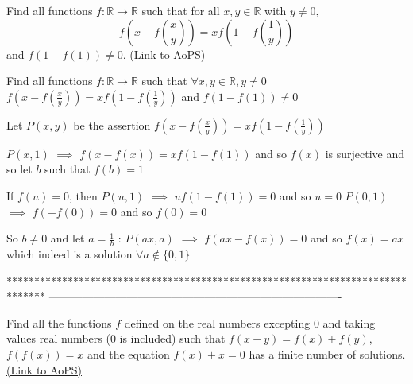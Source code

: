 \begin{problem}
	Find all functions $f:\mathbb{R} \to\mathbb{R}$ such that for all $x,y \in \mathbb{R}$ with $y\neq 0$,
\[f \left( x - f \left( \frac{x}{y} \right)\right)=xf\left(1-f\left(\frac{1}{y}\right)\right)\] and $f(1-f(1))\neq 0$.
	\flushright \href{https://artofproblemsolving.com/community/c6h449397}{(Link to AoPS)}
\end{problem}



\begin{solution}
	\begin{tcolorbox}Find all functions $f:\mathbb{R} \to\mathbb{R}$ such that 
$\forall x,y \in \mathbb{R}, y\neq 0$
$f(x-f(\frac{x}{y}))=xf(1-f(\frac{1}{y}))$ and $f(1-f(1))\neq 0$\end{tcolorbox}
Let $P(x,y)$ be the assertion $f(x-f(\frac xy))=xf(1-f(\frac 1y))$

$P(x,1)$ $\implies$ $f(x-f(x))=xf(1-f(1))$ and so $f(x)$ is surjective and so let $b$ such that $f(b)=1$

If $f(u)=0$, then $P(u,1)$ $\implies$ $uf(1-f(1))=0$ and so $u=0$ 
$P(0,1)$ $\implies$ $f(-f(0))=0$ and so $f(0)=0$

So $b\ne 0$ and let $a=\frac 1b$ : $P(ax,a)$ $\implies$ $f(ax-f(x))=0$ and so $\boxed{f(x)=ax}$ which indeed is a solution $\forall a\notin\{0,1\}$
\end{solution}
*******************************************************************************
-------------------------------------------------------------------------------

\begin{problem}
	Find all the functions  $ f $ defined on the real numbers excepting $ 0 $ and taking values real numbers ($ 0 $ is included) such that $ f(x+y)=f(x)+f(y) $, $ f(f(x))=x $ and the equation $ f(x)+x=0 $ has a finite number of solutions.
	\flushright \href{https://artofproblemsolving.com/community/c6h449881}{(Link to AoPS)}
\end{problem}



